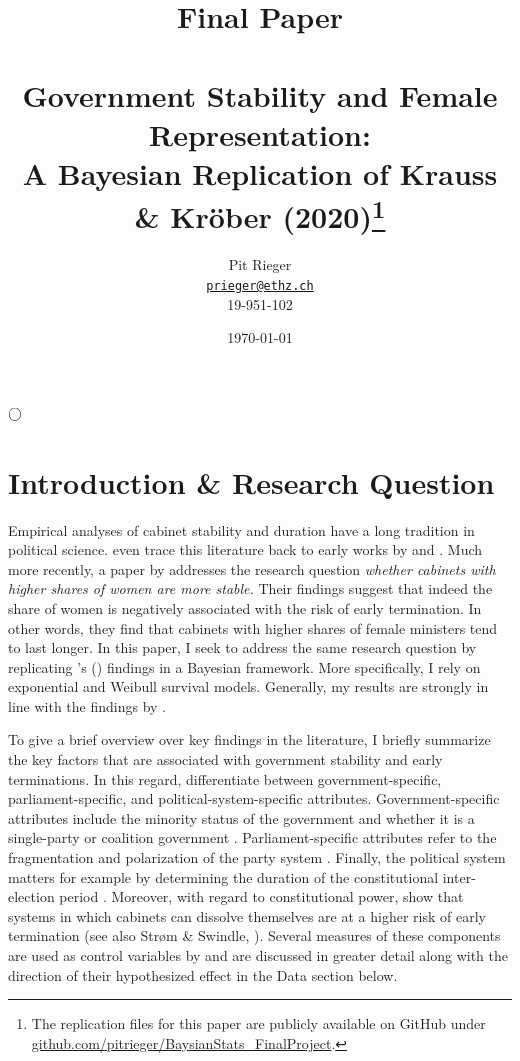 \documentclass[11pt]{article}
\title{\large Final Paper \\ ~ \\
\LARGE  Government Stability and Female Representation:\\
A Bayesian Replication of Krauss \& Kröber (2020)\footnote[1]{The replication files for this paper are publicly available on GitHub under \url{github.com/pitrieger/BaysianStats_FinalProject}.}}
\author{Pit Rieger\\
    \href{mailto:prieger@ethz.ch}{\texttt{prieger@ethz.ch}}\\
    19-951-102}
\date{\today}
\newcommand\possecite[1]{\citeauthor{#1}'s (\citeyear{#1})}
\begin{document}
\maketitle

\bigskip
\bigskip
\bigskip
\bigskip
\begin{center}
    $\Huge \bigcirc$
\end{center}
\bigskip
\bigskip
\bigskip
\bigskip

\begin{abstract}
{\noindent\itshape
\lipsum[1]
}
\end{abstract}

\bigskip
\bigskip
\bigskip
\bigskip

\newpage


\section{Introduction \& Research Question}
Empirical analyses of cabinet stability and duration have a long tradition in political science. \textcite{LupiaStrøm1995} even trace this literature back to early works by \textcite{Bryce1921} and \textcite{Lowell1896}. Much more recently, a paper by \textcite{KK20} addresses the research question \textit{whether cabinets with higher shares of women are more stable.} Their findings suggest that indeed the share of women is negatively associated with the risk of early termination. In other words, they find that cabinets with higher shares of female ministers tend to last longer. In this paper, I seek to address the same research question by replicating \possecite{KK20} findings in a Bayesian framework. More specifically, I rely on exponential and Weibull survival models. Generally, my results are strongly in line with the findings by \textcite{KK20}.

To give a brief overview over key findings in the literature, I briefly summarize the key factors that are associated with government stability and early terminations. In this regard, \textcite{SchleiterMorganJones2009} differentiate between government-specific, parliament-specific, and political-system-specific attributes. Government-specific attributes include the minority status of the government and whether it is a single-party or coalition government \parencite{StromSwindle2002}. Parliament-specific attributes refer to the fragmentation and polarization of the party system \parencite{KingEtAl1990}. Finally, the political system matters for example by determining the duration of the constitutional inter-election period \parencite{StromSwindle2002}. Moreover, with regard to constitutional power, \textcite{SchleiterMorganJones2009} show that systems in which cabinets can dissolve themselves are at a higher risk of early termination (see also Strøm \& Swindle, \citeyear{StromSwindle2002}). Several measures of these components are used as control variables by \textcite{KK20} and are discussed in greater detail along with the direction of their hypothesized effect in the Data section below. 
\end{document}

